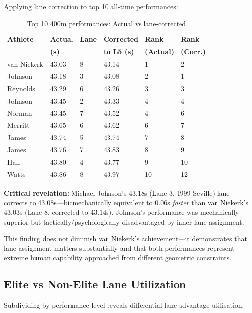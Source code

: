 Applying lane correction to top 10 all-time performances:

\begin{table}[H]
\centering
\caption{Top 10 400m performances: Actual vs lane-corrected}
\small
\begin{tabular}{@{}llllll@{}}
\toprule
\textbf{Athlete} & \textbf{Actual} & \textbf{Lane} & \textbf{Corrected} & \textbf{Rank} & \textbf{Rank} \\
 & \textbf{(s)} & & \textbf{to L5 (s)} & \textbf{(Actual)} & \textbf{(Corr.)} \\
\midrule
van Niekerk & 43.03 & 8 & 43.14 & 1 & 2 \\
Johnson & 43.18 & 3 & 43.08 & 2 & 1 \\
Reynolds & 43.29 & 6 & 43.26 & 3 & 3 \\
Johnson & 43.45 & 2 & 43.33 & 4 & 4 \\
Norman & 43.45 & 7 & 43.52 & 4 & 6 \\
Merritt & 43.65 & 6 & 43.62 & 6 & 7 \\
James & 43.74 & 5 & 43.74 & 7 & 8 \\
James & 43.76 & 7 & 43.83 & 8 & 9 \\
Hall & 43.80 & 4 & 43.77 & 9 & 10 \\
Watts & 43.86 & 8 & 43.97 & 10 & 12 \\
\bottomrule
\end{tabular}
\end{table}

\textbf{Critical revelation:} Michael Johnson's 43.18s (Lane 3, 1999 Seville) lane-corrects to 43.08s—biomechanically equivalent to 0.06s \textit{faster} than van Niekerk's 43.03s (Lane 8, corrected to 43.14s). Johnson's performance was mechanically superior but tactically/psychologically disadvantaged by inner lane assignment.

This finding does not diminish van Niekerk's achievement—it demonstrates that lane assignment matters substantially and that both performances represent extreme human capability approached from different geometric constraints.

\subsection{Elite vs Non-Elite Lane Utilization}

Subdividing by performance level reveals differential lane advantage utilisation:

